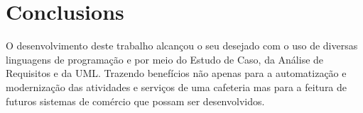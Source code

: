 
\chapter{Conclusions}

O desenvolvimento deste trabalho alcançou o seu desejado com o uso de diversas linguagens de programação e por meio do Estudo de Caso, da Análise de Requisitos e da UML.
Trazendo benefícios não apenas para a automatização e modernização das atividades e serviços de uma cafeteria mas para a feitura de futuros sistemas de comércio que possam ser desenvolvidos.
